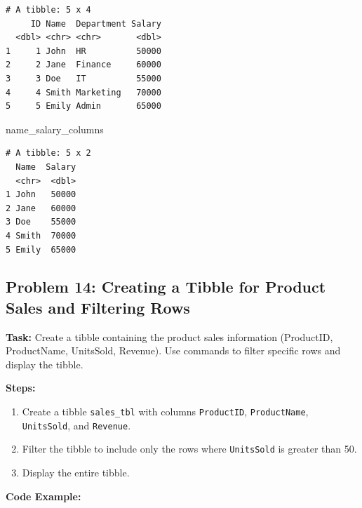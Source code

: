 \documentclass[
  letterpaper,
  DIV=11,
  numbers=noendperiod]{scrreprt}
\newenvironment{Shaded}{\begin{snugshade}}{\end{snugshade}}
\newcommand{\NormalTok}[1]{\textcolor[rgb]{0.00,0.23,0.31}{#1}}
\providecommand{\tightlist}{%
  \setlength{\itemsep}{0pt}\setlength{\parskip}{0pt}}\usepackage{longtable,booktabs,array}
\begin{document}
\begin{verbatim}
# A tibble: 5 x 4
     ID Name  Department Salary
  <dbl> <chr> <chr>       <dbl>
1     1 John  HR          50000
2     2 Jane  Finance     60000
3     3 Doe   IT          55000
4     4 Smith Marketing   70000
5     5 Emily Admin       65000
\end{verbatim}

\begin{Shaded}
\begin{Highlighting}[]
\NormalTok{name\_salary\_columns}
\end{Highlighting}
\end{Shaded}

\begin{verbatim}
# A tibble: 5 x 2
  Name  Salary
  <chr>  <dbl>
1 John   50000
2 Jane   60000
3 Doe    55000
4 Smith  70000
5 Emily  65000
\end{verbatim}

\subsection*{Problem 14: Creating a Tibble for Product Sales and
Filtering
Rows}\label{problem-14-creating-a-tibble-for-product-sales-and-filtering-rows}

\textbf{Task:} Create a tibble containing the product sales information
(ProductID, ProductName, UnitsSold, Revenue). Use commands to filter
specific rows and display the tibble.

\textbf{Steps:}

\begin{enumerate}
\def\labelenumi{\arabic{enumi}.}
\tightlist
\item
  Create a tibble \texttt{sales\_tbl} with columns \texttt{ProductID},
  \texttt{ProductName}, \texttt{UnitsSold}, and \texttt{Revenue}.
\item
  Filter the tibble to include only the rows where \texttt{UnitsSold} is
  greater than 50.
\item
  Display the entire tibble.
\end{enumerate}

\textbf{Code Example:}
\end{document}
